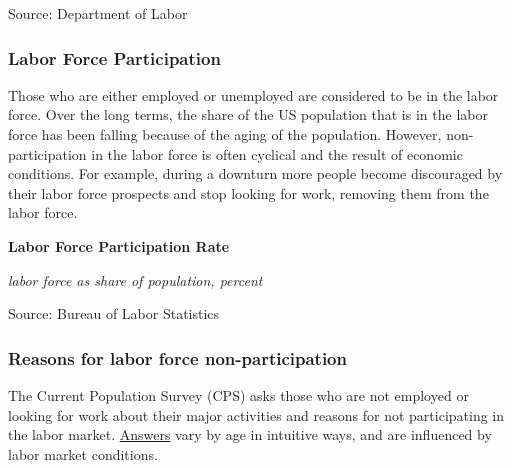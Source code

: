 \documentclass{report}
\makeatletter
\newcommand{\tbllink}[1]{\href{https://raw.githubusercontent.com/bdecon/US-chartbook/master/chartbook/data/#1}{\faTable}}
\newcommand*\short[1]{\expandafter\@gobbletwo\number\numexpr#1\relax}
\newcommand{\dateaxisticks}{
		date coordinates in=x, axis line style={draw=none},
		xmax={2020-08-10},
		max space between ticks=40,	    
		xtick={{1990-01-01}, {1992-01-01}, {1994-01-01}, 
			{1996-01-01}, {1998-01-01}, {2000-01-01}, 
			{2002-01-01}, {2004-01-01}, {2006-01-01},
			{2008-01-01}, {2010-01-01}, {2012-01-01}, {2014-01-01},
		    {2016-01-01}, {2018-01-01}, {2020-01-01}},
		minor xtick={{1989-01-01}, {1991-01-01}, {1993-01-01},
			{1995-01-01}, {1997-01-01}, {1999-01-01}, 
			{2001-01-01}, {2003-01-01}, {2005-01-01}, {2007-01-01},
		    {2009-01-01}, {2011-01-01}, {2013-01-01}, {2015-01-01},
		    {2017-01-01}, {2019-01-01}},
		enlarge y limits={0.06}, enlarge x limits={0.01},
		}
\newcommand{\bbar}[2]{extra #1 ticks = {{#2}}, extra #1 tick labels = ,
		extra #1 tick style = {grid=major, grid style={thick, black!25}},}
\newcommand{\stdline}[4]{\addplot[very thick, no markers, color=#1] 
		table [x=#2, y=#3, col sep=comma] {#4};	}
\newcommand{\rbars}{
		\fill[color=black!10] (axis cs:{1990-07-01},\pgfkeysvalueof{/pgfplots/ymin}) rectangle 
			(axis cs:{1991-03-01}, \pgfkeysvalueof{/pgfplots/ymax});
		\fill[color=black!10] (axis cs:{2007-12-01},\pgfkeysvalueof{/pgfplots/ymin}) rectangle 
			(axis cs:{2009-07-01}, \pgfkeysvalueof{/pgfplots/ymax});
		\fill[color=black!10] (axis cs:{2001-03-01},\pgfkeysvalueof{/pgfplots/ymin}) rectangle 
			(axis cs:{2001-11-01}, \pgfkeysvalueof{/pgfplots/ymax});
		\fill[color=black!10] (axis cs:{2020-02-01},\pgfkeysvalueof{/pgfplots/ymin}) rectangle 
			(axis cs:{2020-09-01}, \pgfkeysvalueof{/pgfplots/ymax});}
\makeatother
\begin{document}
{{{{{{{{{\begin{minipage}{0.34\textwidth}
\footnotesize{Source: Department of Labor} \hfill \tbllink{ccsa.csv}

\end{minipage}

\vspace{5mm}

\begin{minipage}{0.76\textwidth}

\subsubsection*{\color{black!70} \seriffont Labor Force Participation}

\small Those who are either employed or unemployed are considered to be in the labor force. Over the long terms, the share of the US population that is in the labor force has been falling because of the aging of the population. However, non-participation in the labor force is often cyclical and the result of economic conditions. For example, during a downturn more people become discouraged by their labor force prospects and stop looking for work, removing them from the labor force.\\



\vspace{3mm}

\normalsize \textbf{Labor Force Participation Rate}

\footnotesize{\textit{labor force as share of population, percent}}

\hspace*{-2mm} 

\footnotesize{Source: Bureau of Labor Statistics} \hfill \tbllink{lfpr.csv}


\end{minipage}

\newpage

\subsubsection*{\color{black!70} \seriffont Reasons for labor force non-participation}
\begin{minipage}{0.76\textwidth}
\small The Current Population Survey (CPS) asks those who are not employed or looking for work about their major activities and reasons for not participating in the labor market. \href{https://www.frbatlanta.org/chcs/human-capital-currents/2015/0612-measuring-labor-market-status-using-basic-data.aspx}{Answers} vary by age in intuitive ways, and are influenced by labor market conditions. 
\end{minipage}

}}}}}}}}}
\end{document}
